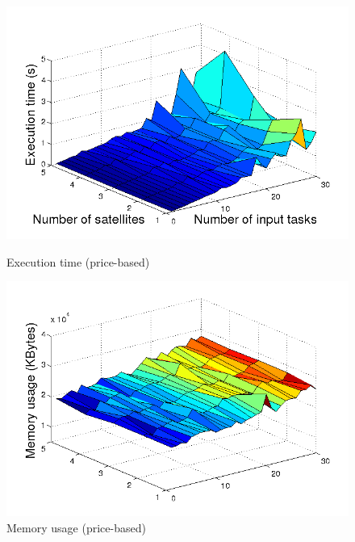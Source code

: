 \begin{figure}[ht]
  \begin{minipage}[b]{0.5\linewidth}
    \includegraphics[width=\linewidth]{Figures/tMB_sw.png}
    \caption{Execution time (price-based)}\label{fig_tMB_sw}
  \end{minipage} 
  \begin{minipage}[b]{0.5\linewidth}
    \includegraphics[width=\linewidth]{Figures/mMB_sw.png} 
    \caption{Memory usage (price-based)}\label{fig_mMB_sw}
  \end{minipage} 
  

\end{figure}
